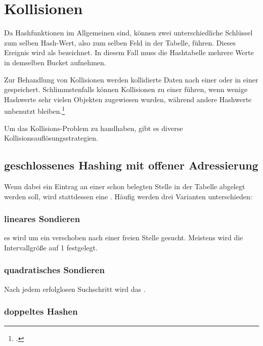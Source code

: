 \documentclass{bschlangaul-haupt}
\begin{document}
\section{Kollisionen}

Da Hashfunktionen im Allgemeinen 
sind, können zwei unterschiedliche Schlüssel zum selben Hash-Wert, also
zum selben Feld in der Tabelle, führen. Dieses Ereignis wird als
 bezeichnet. In diesem Fall muss die Hashtabelle
mehrere Werte in demselben Bucket aufnehmen.

Zur Behandlung von Kollisionen werden kollidierte Daten nach einer
 oder in einer
 gespeichert. Schlimmstenfalls können Kollisionen zu einer
 führen, wenn wenige Hashwerte sehr
vielen Objekten zugewiesen wurden, während andere Hashwerte unbenutzt
bleiben.\footcite{wiki:hashtabelle}

Um das Kollisions-Problem zu handhaben, gibt es diverse
Kollisionsauflösungsstrategien.

%

\subsection{geschlossenes Hashing mit offener Adressierung}

Wenn dabei ein Eintrag an einer schon belegten Stelle in der
Tabelle abgelegt werden soll, wird stattdessen eine . Häufig werden drei Varianten unterschieden:

\subsubsection{lineares Sondieren}

es wird um ein  verschoben nach einer freien
Stelle gesucht. Meistens wird die Intervallgröße auf 1 festgelegt.

\subsubsection{quadratisches Sondieren}

Nach jedem erfolglosen Suchschritt wird das .

\subsubsection{doppeltes Hashen}
\end{document}
